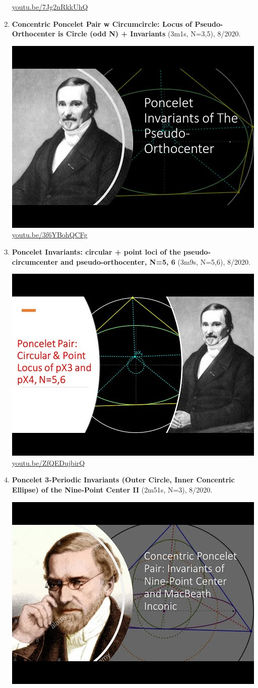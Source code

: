 \documentclass[12pt]{amsart}
\begin{document}
\begin{enumerate}[resume]
\begin{center}
\href{https://youtu.be/7Jg2nRkkUhQ}{\url{youtu.be/7Jg2nRkkUhQ}}\end{center}
% 
\item \textbf{Concentric Poncelet Pair w Circumcircle: Locus of Pseudo-Orthocenter is Circle (odd N) + Invariants} (3m1s, N=3,5), 8/2020. 
\begin{center}\includegraphics[width=.5\textwidth]{pics/3f6YBohQCFg.jpg} \\ 
\href{https://youtu.be/3f6YBohQCFg}{\url{youtu.be/3f6YBohQCFg}}\end{center}
% 
\item \textbf{Poncelet Invariants:
circular + point loci of the pseudo-circumcenter and pseudo-orthocenter, N=5, 6} (3m9s, N=5,6), 8/2020. 
\begin{center}\includegraphics[width=.5\textwidth]{pics/ZfQEDujbirQ.jpg} \\ 
\href{https://youtu.be/ZfQEDujbirQ}{\url{youtu.be/ZfQEDujbirQ}}\end{center}
% 
\item \textbf{Poncelet 3-Periodic Invariants (Outer Circle, Inner Concentric Ellipse) of the Nine-Point Center II} (2m51s, N=3), 8/2020. 
\begin{center}\includegraphics[width=.5\textwidth]{pics/8xlYaQfQCTw.jpg} \\ 

\end{center}
\end{enumerate}
\end{document}
